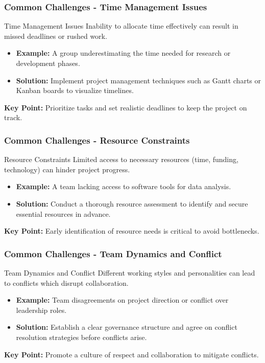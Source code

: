 \documentclass[aspectratio=169]{beamer}
\begin{document}
\begin{frame}[fragile]
  \frametitle{Common Challenges - Time Management Issues}
  \begin{block}{Time Management Issues}
    Inability to allocate time effectively can result in missed deadlines or rushed work.
  \end{block}
  \begin{itemize}
    \item \textbf{Example:} A group underestimating the time needed for research or development phases.
    \item \textbf{Solution:} Implement project management techniques such as Gantt charts or Kanban boards to visualize timelines.
  \end{itemize}
  \textbf{Key Point:} Prioritize tasks and set realistic deadlines to keep the project on track.
\end{frame}

\begin{frame}[fragile]
  \frametitle{Common Challenges - Resource Constraints}
  \begin{block}{Resource Constraints}
    Limited access to necessary resources (time, funding, technology) can hinder project progress.
  \end{block}
  \begin{itemize}
    \item \textbf{Example:} A team lacking access to software tools for data analysis.
    \item \textbf{Solution:} Conduct a thorough resource assessment to identify and secure essential resources in advance.
  \end{itemize}
  \textbf{Key Point:} Early identification of resource needs is critical to avoid bottlenecks.
\end{frame}

\begin{frame}[fragile]
  \frametitle{Common Challenges - Team Dynamics and Conflict}
  \begin{block}{Team Dynamics and Conflict}
    Different working styles and personalities can lead to conflicts which disrupt collaboration.
  \end{block}
  \begin{itemize}
    \item \textbf{Example:} Team disagreements on project direction or conflict over leadership roles.
    \item \textbf{Solution:} Establish a clear governance structure and agree on conflict resolution strategies before conflicts arise.
  \end{itemize}
  \textbf{Key Point:} Promote a culture of respect and collaboration to mitigate conflicts.
\end{frame}
\end{document}
